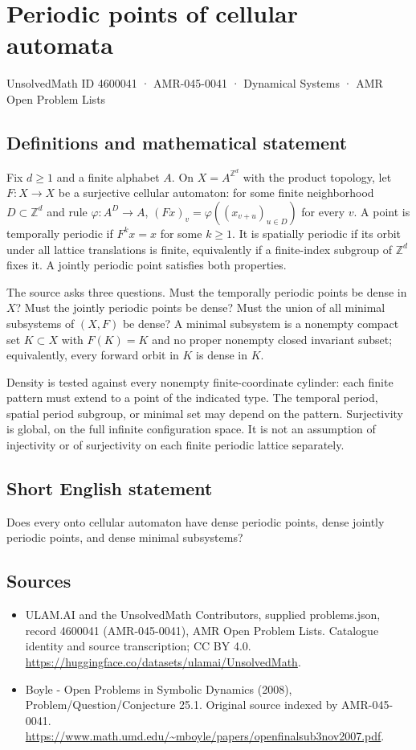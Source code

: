 \documentclass[11pt,a4paper]{article}
\begin{document}
\section*{Periodic points of cellular automata}\label{4600041}
{\small UnsolvedMath ID 4600041 · AMR-045-0041 · Dynamical Systems · AMR Open Problem Lists}
\subsection{Definitions and mathematical statement}
Fix $d\ge1$ and a finite alphabet $A$. On $X=A^{\mathbb Z^d}$ with
the product topology, let $F:X\to X$ be a surjective cellular
automaton: for some finite neighborhood $D\subset\mathbb Z^d$
and rule $\varphi:A^D\to A$,
$(Fx)_v=\varphi((x_{v+u})_{u\in D})$ for every $v$.
A point is temporally periodic if $F^k x=x$ for some $k\ge1$.
It is spatially periodic if its orbit under all lattice translations
is finite, equivalently if a finite-index subgroup of $\mathbb Z^d$
fixes it. A jointly periodic point satisfies both properties.

The source asks three questions. Must the temporally periodic points
be dense in $X$? Must the jointly periodic points be dense? Must
the union of all minimal subsystems of $(X,F)$ be dense?
A minimal subsystem is a nonempty compact set $K\subset X$ with
$F(K)=K$ and no proper nonempty closed invariant subset;
equivalently, every forward orbit in $K$ is dense in $K$.

Density is tested against every nonempty finite-coordinate cylinder:
each finite pattern must extend to a point of the indicated type.
The temporal period, spatial period subgroup, or minimal set may
depend on the pattern. Surjectivity is global, on the full infinite
configuration space. It is not an assumption of injectivity or of
surjectivity on each finite periodic lattice separately.
\subsection{Short English statement}
Does every onto cellular automaton have dense periodic points, dense jointly periodic points, and dense minimal subsystems?
\subsection{Sources}
\begin{itemize}
\item[S1] ULAM.AI and the UnsolvedMath Contributors, supplied problems.json, record 4600041 (AMR-045-0041), AMR Open Problem Lists. Catalogue identity and source transcription; CC BY 4.0.
\url{https://huggingface.co/datasets/ulamai/UnsolvedMath}.
\item[S2] Boyle - Open Problems in Symbolic Dynamics (2008), Problem/Question/Conjecture 25.1. Original source indexed by AMR-045-0041.
\url{https://www.math.umd.edu/~mboyle/papers/openfinalsub3nov2007.pdf}.
\end{itemize}
\end{document}
